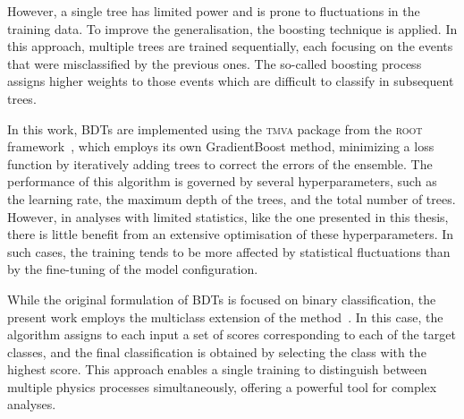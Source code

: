 However, a single tree has limited power and is prone to fluctuations in the training data. To improve the generalisation, the boosting technique is applied. In this approach, multiple trees are trained sequentially, each focusing on the events that were misclassified by the previous ones. The so-called boosting process assigns higher weights to those events which are difficult to classify in subsequent trees.

In this work, BDTs are implemented using the \textsc{tmva} package from the \textsc{root} framework~\cite{tmvatoolkit}, which employs its own GradientBoost method, minimizing a loss function by iteratively adding trees to correct the errors of the ensemble. 
The performance of this algorithm is governed by several hyperparameters, such as the learning rate, 
the maximum depth of the trees, and the total number of trees. However, in analyses with limited 
statistics, like the one presented in this thesis, there is little benefit from an extensive optimisation 
of these hyperparameters. In such cases, the training tends to be more affected by statistical fluctuations 
than by the fine-tuning of the model configuration.

While the original formulation of BDTs is focused on binary classification, the present work employs the multiclass extension of the method~\cite{tmvatoolkit}. In this case, the algorithm assigns to each input a set of scores corresponding to each of the target classes, and the final classification is obtained by selecting the class with the highest score. This approach enables a single training to distinguish between multiple physics processes simultaneously, offering a powerful tool for complex analyses.




